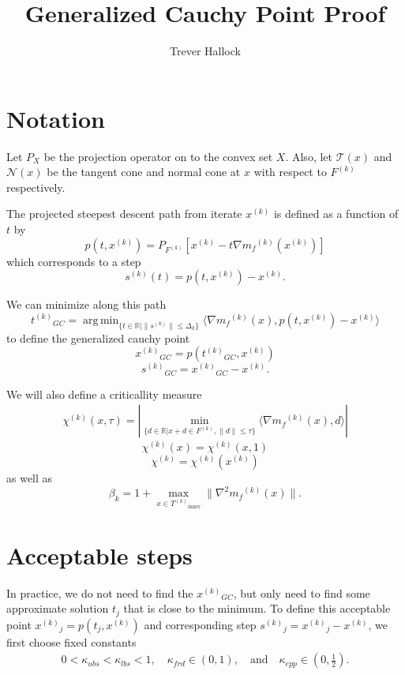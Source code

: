 \documentclass{article}
\title{Generalized Cauchy Point Proof}
\author{Trever Hallock}
\DeclareMathOperator*{\argmin}{arg\,min}
\theoremstyle{case}
\newcommand{\modelk}{{{m}_f}^{(k)}}
\newcommand{\gradmodelk}{\nabla{{m}_f}^{(k)}}
\newcommand{\iteratek}{{x}^{(k)}}
\newcommand{\trialk}{{s}^{(k)}}
\newcommand{\innertrk}{{T^{(k)}}_{\text{inner}}}
\newcommand{\feasiblek}{{F}^{(k)}}
\newcommand{\ptx}{p(t,\iteratek)}
\newcommand{\Px}{P_X}
\newcommand{\tj}{t_j}
\newcommand{\tgc}{{{t}^{(k)}}_{GC}}
\newcommand{\gck}{{{x}^{(k)}}_{GC}}
\newcommand{\sgck}{{{s}^{(k)}}_{GC}}
\newcommand{\chik}{{\chi^{(k)}}}
\newcommand{\xj}{{{x}^{(k)}}_{j}}
\newcommand{\sj}{{{s}^{(k)}}_{j}}
\begin{document}
\section{Notation}

Let $\Px$ be the projection operator on to the convex set $X$.
Also, let $\mathcal T(x)$ and $\mathcal N(x)$ be the tangent cone and normal cone at $x$ with respect to $\feasiblek$ respectively.

The projected steepest descent path from iterate $\iteratek$ is defined as a function of $t$ by
\[ \ptx = P_{\feasiblek}[\iteratek-t\gradmodelk(\iteratek)] \]
which corresponds to a step
\[ \trialk(t) = p(t,\iteratek)-\iteratek. \]

We can minimize along this path 
\[\tgc = \argmin_{\{t\in\mathbb R|\|\trialk \| \le \Delta_k\}} \langle \gradmodelk(x), \ptx - \iteratek \rangle \]
to define the generalized cauchy point
\[\gck = p(\tgc, \iteratek)\]
\[\sgck = \gck-\iteratek.\]

We will also define a criticallity measure
\begin{align}
\label{chi_definition} \chik(x, \tau) = | \min_{\{d \in \mathbb R | x+d \in \feasiblek, \|d\| \le \tau\}}\langle \gradmodelk(x), d\rangle|
\end{align}
\[\chik(x) = \chik(x, 1)\]
\[\chik = \chik(\iteratek)\]
as well as
\[\beta_k = 1 + \max_{x\in\innertrk}\|\nabla^2\modelk(x)\|.\]

\section{Acceptable steps}
\label{close_enough}
In practice, we do not need to find the $\gck$, but only need to find some approximate solution $\tj$ that is close to the minimum.
To define this acceptable point $\xj = p(\tj, \iteratek)$ and corresponding step $\sj = \xj - \iteratek$, we first choose fixed constants
\begin{align}
0 < \kappa_{ubs} < \kappa_{lbs} < 1, \quad \kappa_{frd} \in (0, 1), \quad \text{and} \quad\kappa_{epp} \in (0, \frac 1 2 ).
\end{align}
\end{document}

